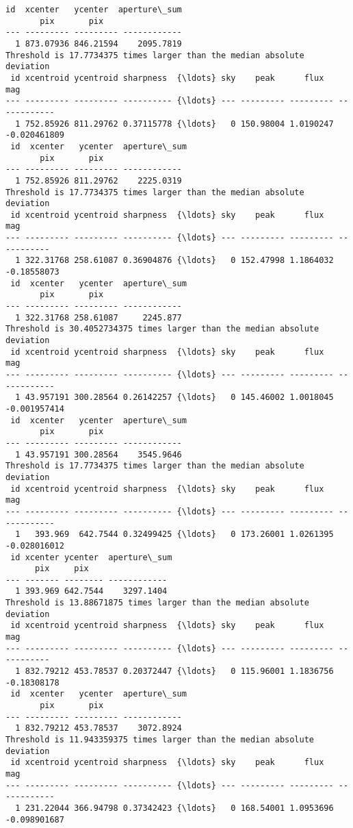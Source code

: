 \documentclass[11pt]{article}
\begin{document}
\begin{Verbatim}[commandchars=\\\{\}]
 id  xcenter   ycenter  aperture\_sum
       pix       pix
--- --------- --------- ------------
  1 873.07936 846.21594    2095.7819
Threshold is 17.7734375 times larger than the median absolute deviation
 id xcentroid ycentroid sharpness  {\ldots} sky    peak      flux       mag
--- --------- --------- ---------- {\ldots} --- --------- --------- ------------
  1 752.85926 811.29762 0.37115778 {\ldots}   0 150.98004 1.0190247 -0.020461809
 id  xcenter   ycenter  aperture\_sum
       pix       pix
--- --------- --------- ------------
  1 752.85926 811.29762    2225.0319
Threshold is 17.7734375 times larger than the median absolute deviation
 id xcentroid ycentroid sharpness  {\ldots} sky    peak      flux       mag
--- --------- --------- ---------- {\ldots} --- --------- --------- -----------
  1 322.31768 258.61087 0.36904876 {\ldots}   0 152.47998 1.1864032 -0.18558073
 id  xcenter   ycenter  aperture\_sum
       pix       pix
--- --------- --------- ------------
  1 322.31768 258.61087     2245.877
Threshold is 30.4052734375 times larger than the median absolute deviation
 id xcentroid ycentroid sharpness  {\ldots} sky    peak      flux       mag
--- --------- --------- ---------- {\ldots} --- --------- --------- ------------
  1 43.957191 300.28564 0.26142257 {\ldots}   0 145.46002 1.0018045 -0.001957414
 id  xcenter   ycenter  aperture\_sum
       pix       pix
--- --------- --------- ------------
  1 43.957191 300.28564    3545.9646
Threshold is 17.7734375 times larger than the median absolute deviation
 id xcentroid ycentroid sharpness  {\ldots} sky    peak      flux       mag
--- --------- --------- ---------- {\ldots} --- --------- --------- ------------
  1   393.969  642.7544 0.32499425 {\ldots}   0 173.26001 1.0261395 -0.028016012
 id xcenter ycenter  aperture\_sum
      pix     pix
--- ------- -------- ------------
  1 393.969 642.7544    3297.1404
Threshold is 13.88671875 times larger than the median absolute deviation
 id xcentroid ycentroid sharpness  {\ldots} sky    peak      flux       mag
--- --------- --------- ---------- {\ldots} --- --------- --------- -----------
  1 832.79212 453.78537 0.20372447 {\ldots}   0 115.96001 1.1836756 -0.18308178
 id  xcenter   ycenter  aperture\_sum
       pix       pix
--- --------- --------- ------------
  1 832.79212 453.78537    3072.8924
Threshold is 11.943359375 times larger than the median absolute deviation
 id xcentroid ycentroid sharpness  {\ldots} sky    peak      flux       mag
--- --------- --------- ---------- {\ldots} --- --------- --------- ------------
  1 231.22044 366.94798 0.37342423 {\ldots}   0 168.54001 1.0953696 -0.098901687

\end{Verbatim}
\end{document}
